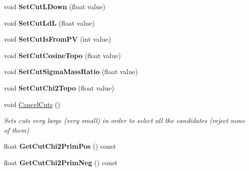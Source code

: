 \begin{DoxyCompactItemize}
\item 
void {\bfseries Set\+Cut\+L\+Down} (float value)\hypertarget{classCutsContainer_a3ae9156d2798e9f660dd9745c96e9968}{}\label{classCutsContainer_a3ae9156d2798e9f660dd9745c96e9968}

\item 
void {\bfseries Set\+Cut\+LdL} (float value)\hypertarget{classCutsContainer_a0ae98fef719ab8104414fe95b83ece7f}{}\label{classCutsContainer_a0ae98fef719ab8104414fe95b83ece7f}

\item 
void {\bfseries Set\+Cut\+Is\+From\+PV} (int value)\hypertarget{classCutsContainer_a794b6e3deb8a80d21406705e01336d49}{}\label{classCutsContainer_a794b6e3deb8a80d21406705e01336d49}

\item 
void {\bfseries Set\+Cut\+Cosine\+Topo} (float value)\hypertarget{classCutsContainer_a12a4bb93a9ba2c003013b82ba57c727d}{}\label{classCutsContainer_a12a4bb93a9ba2c003013b82ba57c727d}

\item 
void {\bfseries Set\+Cut\+Sigma\+Mass\+Ratio} (float value)\hypertarget{classCutsContainer_aa30c05c435d130e53abb4a061c9cf497}{}\label{classCutsContainer_aa30c05c435d130e53abb4a061c9cf497}

\item 
void {\bfseries Set\+Cut\+Chi2\+Topo} (float value)\hypertarget{classCutsContainer_a195adedc6b2fa133cdc4f7aa804844a6}{}\label{classCutsContainer_a195adedc6b2fa133cdc4f7aa804844a6}

\item 
void \hyperlink{classCutsContainer_ae987210c71dd3718774394a0f3a6ae89}{Cancel\+Cuts} ()\hypertarget{classCutsContainer_ae987210c71dd3718774394a0f3a6ae89}{}\label{classCutsContainer_ae987210c71dd3718774394a0f3a6ae89}

\begin{DoxyCompactList}\small\item\em Sets cuts very large (very small) in order to select all the candidates (reject none of them) \end{DoxyCompactList}\item 
float {\bfseries Get\+Cut\+Chi2\+Prim\+Pos} () const \hypertarget{classCutsContainer_aabd2ecb2920034a1706a74cc57910856}{}\label{classCutsContainer_aabd2ecb2920034a1706a74cc57910856}

\item 
float {\bfseries Get\+Cut\+Chi2\+Prim\+Neg} () const \hypertarget{classCutsContainer_a1cd9f62311bbfd3a2d6528e2a51b4f2f}{}\label{classCutsContainer_a1cd9f62311bbfd3a2d6528e2a51b4f2f}


\end{DoxyCompactItemize}
